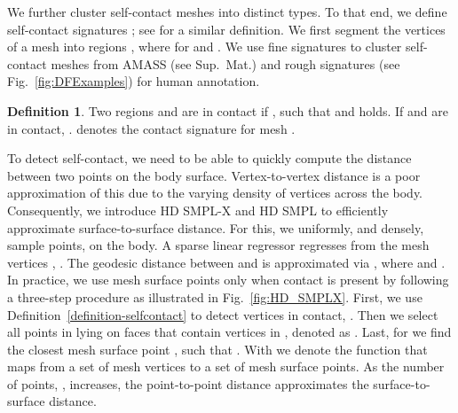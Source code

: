 \documentclass[final]{cvpr}
\newcommand{\suppmat}{Sup.~Mat.\xspace}
\theoremstyle{definition}
\newtheorem{definition}{Definition}[section]
\begin{document}
We further cluster self-contact meshes into distinct types.
To that end, we define self-contact signatures ;
see \cite{Fieraru_2021_AAAI} for a similar definition.
We first segment
the vertices of a mesh into  regions , where   for  and .
We use fine signatures to cluster self-contact meshes from AMASS (see \suppmat) and rough signatures
(see Fig.~\ref{fig:DFExamples}) for human annotation.
\begin{definition}
\label{definition-signature}
Two regions  and  are in contact if , such that  and  holds. If  and  are in contact, .  denotes the contact signature for mesh . 
\end{definition}

To detect self-contact, we need to be able to quickly compute the distance between two points on the body surface.
Vertex-to-vertex distance is a poor approximation of this due to the varying density of vertices across the body.
Consequently, we introduce HD SMPL-X and HD SMPL to efficiently approximate surface-to-surface distance.
For this, we uniformly, and densely, sample points,  on the body. 
A sparse linear regressor  regresses  from the mesh vertices , . The geodesic distance  
between  and  is approximated via , where  
and .
In practice, we use mesh surface points only when contact is present by following a three-step procedure as illustrated in Fig.~\ref{fig:HD_SMPLX}. First, we use 
Definition~\ref{definition-selfcontact} to detect vertices in contact, . Then we select all points 
in  lying on faces that contain vertices in , denoted as . Last, for  we find the 
closest mesh surface point , such that 
. With  
we denote the function that maps from a set of mesh vertices to a set of mesh surface points.
As the number of points, , increases, the point-to-point distance approximates the surface-to-surface distance.
\end{document}
